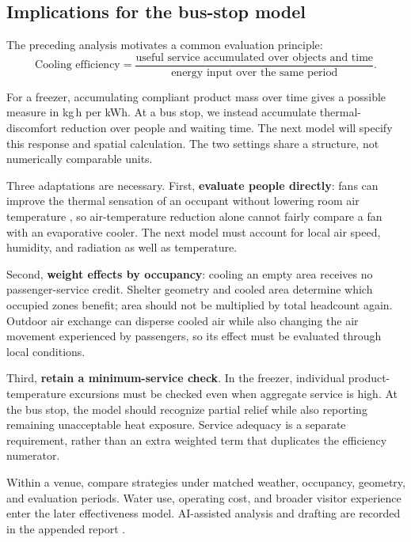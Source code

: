 \documentclass[12pt]{article}
\begin{document}
\subsection{Implications for the bus-stop model}

The preceding analysis motivates a common evaluation principle:
\begin{equation}
\boxed{\text{Cooling efficiency}
=\frac{\text{useful service accumulated over objects and time}}
{\text{energy input over the same period}}.}
\label{eq:principle}
\end{equation}

For a freezer, accumulating compliant product mass over time gives a possible measure in kg\,h per kWh. At a bus stop, we instead accumulate thermal-discomfort reduction over people and waiting time. The next model will specify this response and spatial calculation. The two settings share a structure, not numerically comparable units.

Three adaptations are necessary. First, \textbf{evaluate people directly}: fans can improve the thermal sensation of an occupant without lowering room air temperature \cite{energystar}, so air-temperature reduction alone cannot fairly compare a fan with an evaporative cooler. The next model must account for local air speed, humidity, and radiation as well as temperature.

Second, \textbf{weight effects by occupancy}: cooling an empty area receives no passenger-service credit. Shelter geometry and cooled area determine which occupied zones benefit; area should not be multiplied by total headcount again. Outdoor air exchange can disperse cooled air while also changing the air movement experienced by passengers, so its effect must be evaluated through local conditions.

Third, \textbf{retain a minimum-service check}. In the freezer, individual product-temperature excursions must be checked even when aggregate service is high. At the bus stop, the model should recognize partial relief while also reporting remaining unacceptable heat exposure. Service adequacy is a separate requirement, rather than an extra weighted term that duplicates the efficiency numerator.

Within a venue, compare strategies under matched weather, occupancy, geometry, and evaluation periods. Water use, operating cost, and broader visitor experience enter the later effectiveness model. AI-assisted analysis and drafting are recorded in the appended report \cite{codex}.
\end{document}
